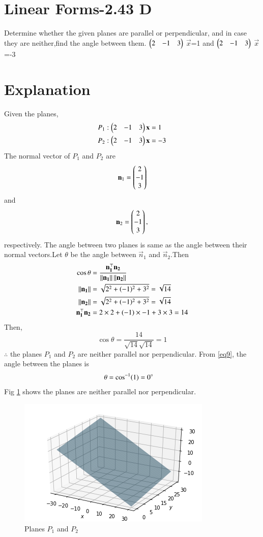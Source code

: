 \documentclass[journal,12pt,twocolumn]{IEEEtran}
\begin{document}
\section{Linear Forms-2.43 D}
Determine whether the given planes are parallel or perpendicular, and in case they are neither,find the angle between them.
$\begin{pmatrix}2&-1&3\end{pmatrix}$ $\vec x$=1  and $\begin{pmatrix}2&-1&3\end{pmatrix}$ $\vec{x}$=-3
\section{Explanation}
Given the planes,
\begin{align}
P_1:\begin{pmatrix}2&-1&3\end{pmatrix}\mathbf{x}&=1 \\
P_2 :\begin{pmatrix}2&-1&3\end{pmatrix} \mathbf{x}&=-3
\end{align}
The normal vector of $P_1$ and $P_2$ are 
\begin{equation}
 \mathbf n_1=\begin{pmatrix}2\\-1\\3\end{pmatrix} \end{equation}and
 \begin{equation}
 \mathbf n_2 =\begin{pmatrix}2\\-1\\3\end{pmatrix},
\end{equation} respectively.
The angle between two planes is same as the angle between their normal vectors.Let $\theta$ be the angle between $\vec n_1$ and $\vec n_2$.Then
\begin{align}
    \cos\theta &= \frac{\mathbf{n_1^\top}\mathbf{n_2}}{\left\lVert\mathbf{n_1}\right\rVert\left\lVert\mathbf{n_2}\right\rVert}\\
    \left\lVert\mathbf{n_1}\right\rVert&=\sqrt{2^2+(-1)^2+3^2}=\sqrt{14}\\
    \left\lVert\mathbf{n_2}\right\rVert&=\sqrt{2^2+(-1)^2+3^2}=\sqrt{14}\\
   \mathbf{n_1^\top}\mathbf{n_2}&=2\times2+(-1)\times{-1}+3\times3=14
\end{align}
Then,\begin{equation}
\label{eq9}
    \cos{\theta}=\frac{14}{\sqrt{14}\sqrt{14}}=1
\end{equation} 
$\therefore$ the planes $P_1$ and $P_2$ are neither parallel nor perpendicular.
From \ref{eq9}, the angle between the planes is
\begin{align}
   \theta &=\cos^{-1}(1)=0\degree
\end{align}
Fig \ref{fig:1} shows the planes are neither parallel nor perpendicular.
\begin{figure}[!ht]
\centering
    \includegraphics[width= \columnwidth]{figure4.png}
    \caption{Planes $P_1$ and $P_2$} \label{fig:1}
\end{figure}
\end{document}
